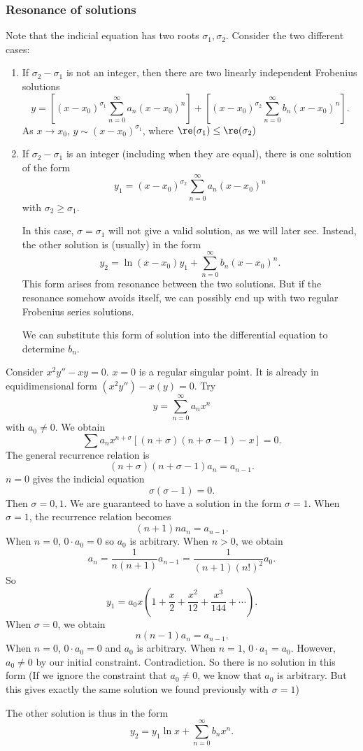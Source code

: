 \documentclass[a4paper]{article}
\begin{document}
\subsubsection*{Resonance of solutions}
Note that the indicial equation has two roots $\sigma_1, \sigma_2$. Consider the two different cases:
\begin{enumerate}
  \item If $\sigma_2 - \sigma_1$ is not an integer, then there are two linearly independent Frobenius solutions
    \[
      y = \left[(x - x_0)^{\sigma_1}\sum_{n = 0}^{\infty} a_n(x - x_0)^n\right] + \left[(x - x_0)^{\sigma_2}\sum_{n = 0}^{\infty} b_n(x - x_0)^n\right].
    \]
    As $x\to x_0$, $y \sim (x - x_0)^{\sigma_1}$, where $\re(\sigma_1) \leq \re(\sigma_2)$

  \item If $\sigma_2 - \sigma_1$ is an integer (including when they are equal), there is one solution of the form
    \[
      y_1 = (x - x_0)^{\sigma_2}\sum_{n = 0}^{\infty} a_n(x - x_0)^n
    \]
    with $\sigma_2 \geq \sigma_1$.

    In this case, $\sigma = \sigma_1$ will not give a valid solution, as we will later see. Instead, the other solution is (usually) in the form
    \[
      y_2 = \ln(x - x_0)y_1 + \sum_{n = 0}^\infty b_n(x - x_0)^n.
    \]
    This form arises from resonance between the two solutions. But if the resonance somehow avoids itself, we can possibly end up with two regular Frobenius series solutions.

    We can substitute this form of solution into the differential equation to determine $b_n$.
\end{enumerate}
\begin{eg}
  Consider $x^2 y'' - xy = 0$. $x = 0$ is a regular singular point. It is already in equidimensional form $(x^2y'') - x(y) = 0$. Try
  \[
    y = \sum_{n = 0}^\infty a_n x^n
  \]
  with $a_0 \not= 0$. We obtain
  \[
    \sum a_nx^{n + \sigma}[(n + \sigma)(n + \sigma - 1) - x] = 0.
  \]
  The general recurrence relation is
  \[
    (n + \sigma)(n + \sigma - 1)a_n = a_{n - 1}.
  \]
  $n = 0$ gives the indicial equation
  \[
    \sigma(\sigma - 1) = 0.
  \]
  Then $\sigma = 0, 1$. We are guaranteed to have a solution in the form $\sigma = 1$. When $\sigma = 1$, the recurrence relation becomes
  \[
    (n + 1)n a_n = a_{n - 1}.
  \]
  When $n = 0$, $0\cdot a_0 = 0$ so $a_0$ is arbitrary.
  When $n > 0$, we obtain
  \[
    a_n = \frac{1}{n(n +1)}a_{n - 1} = \frac{1}{(n + 1)(n!)^2}a_0.
  \]
  So
  \[
    y_1 = a_0x\left(1 + \frac{x}{2} + \frac{x^2}{12} + \frac{x^3}{144} + \cdots \right).
  \]
  When $\sigma = 0$, we obtain
  \[
    n(n - 1)a_n = a_{n - 1}.
  \]
  When $n = 0$, $0\cdot a_0 = 0$ and $a_0$ is arbitrary. When $n = 1$, $0\cdot a_1 = a_0$. However, $a_0\not= 0$ by our initial constraint. Contradiction. So there is no solution in this form (If we ignore the constraint that $a_0\not= 0$, we know that $a_0$ is arbitrary. But this gives exactly the same solution we found previously with $\sigma = 1$)

  The other solution is thus in the form
  \[
    y_2 = y_1\ln x + \sum_{n = 0}^\infty b_nx^n.
  \]
\end{eg}
\end{document}
